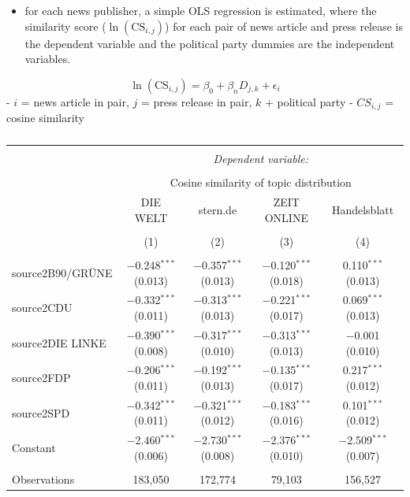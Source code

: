 \documentclass[
]{article}
\providecommand{\tightlist}{%
  \setlength{\itemsep}{0pt}\setlength{\parskip}{0pt}}
\begin{document}
\begin{itemize}
\tightlist
\item
  for each news publisher, a simple OLS regression is estimated, where
  the similarity score (\(\ln(\text{CS}_{i,j})\)) for each pair of news
  article and press release is the dependent variable and the political
  party dummies are the independent variables.
\end{itemize}

\[
\ln(\text{CS}_{i,j})=\beta_0+\beta_nD_{j,k}+\epsilon_i
\] - \(i\) = news article in pair, \(j\) = press release in pair, \(k\)
+ political party - \(CS_{i,j}\) = cosine similarity

\begin{table}[!htbp] \centering 
  \caption{} 
  \label{} 
\tiny 
\begin{tabular}{@{\extracolsep{5pt}}lcccc} 
\\[-1.8ex]\hline 
\hline \\[-1.8ex] 
 & \multicolumn{4}{c}{\textit{Dependent variable:}} \\ 
\cline{2-5} 
\\[-1.8ex] & \multicolumn{4}{c}{Cosine similarity of topic distribution} \\ 
 & DIE WELT & stern.de & ZEIT ONLINE & Handelsblatt \\ 
\\[-1.8ex] & (1) & (2) & (3) & (4)\\ 
\hline \\[-1.8ex] 
 source2B90/GRÜNE & $-$0.248$^{***}$ (0.013) & $-$0.357$^{***}$ (0.013) & $-$0.120$^{***}$ (0.018) & 0.110$^{***}$ (0.013) \\ 
  source2CDU & $-$0.332$^{***}$ (0.011) & $-$0.313$^{***}$ (0.013) & $-$0.221$^{***}$ (0.017) & 0.069$^{***}$ (0.013) \\ 
  source2DIE LINKE & $-$0.390$^{***}$ (0.008) & $-$0.317$^{***}$ (0.010) & $-$0.313$^{***}$ (0.013) & $-$0.001 (0.010) \\ 
  source2FDP & $-$0.206$^{***}$ (0.011) & $-$0.192$^{***}$ (0.013) & $-$0.135$^{***}$ (0.017) & 0.217$^{***}$ (0.012) \\ 
  source2SPD & $-$0.342$^{***}$ (0.011) & $-$0.321$^{***}$ (0.012) & $-$0.183$^{***}$ (0.016) & 0.101$^{***}$ (0.012) \\ 
  Constant & $-$2.460$^{***}$ (0.006) & $-$2.730$^{***}$ (0.008) & $-$2.376$^{***}$ (0.010) & $-$2.509$^{***}$ (0.007) \\ 
 \hline \\[-1.8ex] 
Observations & 183,050 & 172,774 & 79,103 & 156,527 \\ 

\end{tabular}
\end{table}
\end{document}
